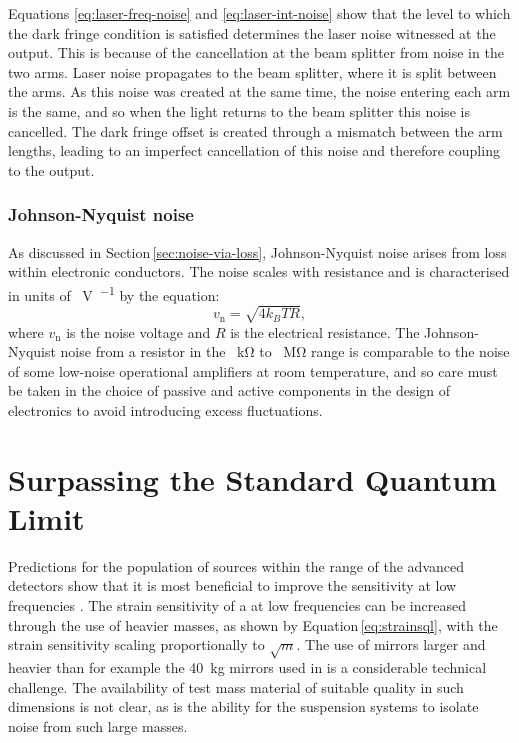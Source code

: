 Equations \ref{eq:laser-freq-noise} and \ref{eq:laser-int-noise} show that the level to which the dark fringe condition is satisfied determines the laser noise witnessed at the output. This is because of the cancellation at the beam splitter from noise in the two arms. Laser noise propagates to the beam splitter, where it is split between the arms. As this noise was created at the same time, the noise entering each arm is the same, and so when the light returns to the beam splitter this noise is cancelled. The dark fringe offset is created through a mismatch between the arm lengths, leading to an imperfect cancellation of this noise and therefore coupling to the output.

\subsubsection{Johnson-Nyquist noise}
As discussed in Section\,\ref{sec:noise-via-loss}, Johnson-Nyquist noise arises from loss within electronic conductors. The noise scales with resistance and is characterised in units of \SI{}{\volt\per\sqrthz} by the equation:
\begin{equation}
  v_{\text{n}} = \sqrt{4 k_B T R},
\end{equation}
where $v_{\text{n}}$ is the noise voltage and $R$ is the electrical resistance. The Johnson-Nyquist noise from a resistor in the \SI{}{\kilo\ohm} to \SI{}{\mega\ohm} range is comparable to the noise of some low-noise operational amplifiers at room temperature, and so care must be taken in the choice of passive and active components in the design of electronics to avoid introducing excess fluctuations.

\section{\label{sec:sub-sql-techniques}Surpassing the Standard Quantum Limit}
Predictions for the population of sources within the range of the advanced detectors show that it is most beneficial to improve the sensitivity at low frequencies . The strain sensitivity of a \MI{} at low frequencies can be increased through the use of heavier masses, as shown by Equation\,\ref{eq:strainsql}, with the strain sensitivity scaling proportionally to $\sqrt{m}$. The use of mirrors larger and heavier than for example the \SI{40}{\kilo\gram} mirrors used in \ALIGO{} is a considerable technical challenge. The availability of test mass material of suitable quality in such dimensions is not clear, as is the ability for the suspension systems to isolate noise from such large masses.

